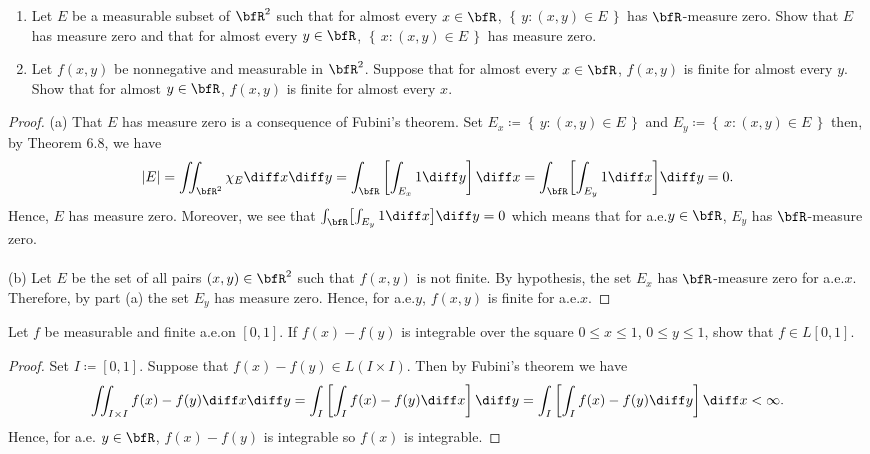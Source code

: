 
\begin{problem}
\begin{enumerate}[label=(\alph*)]
\item Let $E$ be a measurable subset of $\bfR^2$ such that for almost every
  $x\in\bfR$, $\left\{\,y:(x,y)\in E\,\right\}$ has
  $\bfR$-measure zero. Show that $E$ has measure zero and that for almost
  every $y\in\bfR$, $\left\{\,x:(x,y)\in E\,\right\}$ has
  measure zero.
\item Let $f(x,y)$ be nonnegative and measurable in $\bfR^2$. Suppose that
  for almost every $x\in\bfR$, $f(x,y)$ is finite for almost every
  $y$. Show that for almost $y\in\bfR$, $f(x,y)$ is finite for almost
  every $x$.
\end{enumerate}
\end{problem}
\begin{proof}
(a) That $E$ has measure zero is a consequence of Fubini's theorem. Set
$E_x\coloneqq\left\{\,y:(x,y)\in E\,\right\}$ and
$E_y\coloneqq\left\{\,x:(x,y)\in E\,\right\}$ then, by Theorem 6.8, we have
\begin{equation}
\label{eq:consequence-of-fubini}
|E|=
\iint_{\bfR^2}\chi_E\diff x\diff y=
\int_\bfR\left[\int_{E_x}1\diff y\right]\diff x=
\int_\bfR\biggl[\int_{E_y}1\diff x\biggr]\diff y=
0.
\end{equation}
Hence, $E$ has measure zero. Moreover, we see that
$\int_\bfR\bigl[\int_{E_y}1\diff x\bigr]\diff y=0$ which means that for
a.e.\@ $y\in\bfR$, $E_y$ has $\bfR$-measure zero.
\\\\
(b) Let $E$ be the set of all pairs $(x,y)\in\bfR^2$ such that $f(x,y)$ is
not finite. By hypothesis, the set $E_x$ has $\bfR$-measure zero for
a.e.\@ $x$. Therefore, by part (a) the set $E_y$ has measure zero. Hence,
for a.e.\@ $y$, $f(x,y)$ is finite for a.e.\@ $x$.
\end{proof}
\newpage

\begin{problem}
Let $f$ be measurable and finite a.e.\@ on $[0,1]$. If $f(x)-f(y)$ is
integrable over the square $0\leq x\leq 1$, $0\leq y\leq 1$, show that
$f\in L[0,1]$.
\end{problem}
\begin{proof}
Set $I\coloneqq[0,1]$. Suppose that $f(x)-f(y)\in L(I\times I)$. Then by
Fubini's theorem we have
\begin{equation}
  \label{eq:double-integral}
\iint_{I\times I}f(x)-f(y)\diff x\diff y=
\int_I\left[\int_I f(x)-f(y)\diff x\right]\diff y=
\int_I\left[\int_I f(x)-f(y)\diff y\right]\diff x<\infty.
\end{equation}
Hence, for a.e. $y\in\bfR$, $f(x)-f(y)$ is integrable so $f(x)$ is
integrable.
\end{proof}
\newpage

